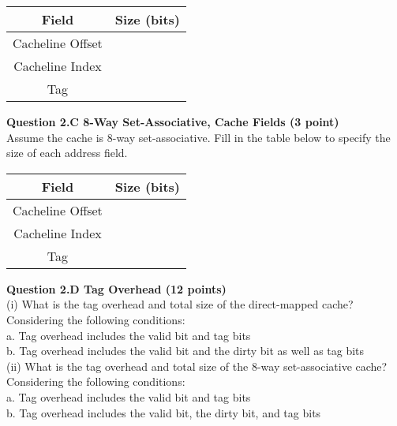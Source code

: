 \documentclass[a4paper,10pt]{article}
\begin{document}
\begin{enumerate}
\begin{center}
\begin{tabular}{cc}
\toprule  
\textbf{Field} & \textbf{ Size (bits)} \\
\midrule  
Cacheline Offset& \\
\midrule
Cacheline Index& \\
\midrule
Tag& \\
\bottomrule 
\end{tabular}
\end{center}


\textbf{Question 2.C 8-Way Set-Associative, Cache Fields (3 point)}\\
Assume the cache is 8-way set-associative. Fill in the table below to specify the size of each address field.\\

\begin{center}
\begin{tabular}{cc}
\toprule  
\textbf{Field} & \textbf{ Size (bits)} \\
\midrule  
Cacheline Offset& \\
\midrule
Cacheline Index& \\
\midrule
Tag& \\
\bottomrule 
\end{tabular}
\end{center}


\textbf{Question 2.D Tag Overhead (12 points)}\\
(i) What is the tag overhead and total size of the direct-mapped cache? \\
Considering the following conditions:\\
a. Tag overhead includes the valid bit and tag bits\\
b. Tag overhead includes the valid bit and the dirty bit as well as tag bits\\


(ii) What is the tag overhead and total size of the 8-way set-associative cache?\\
Considering the following conditions:\\
a. Tag overhead includes the valid bit and tag bits\\
b. Tag overhead includes the valid bit, the dirty bit, and tag bits\\



\end{enumerate}
\end{document}
